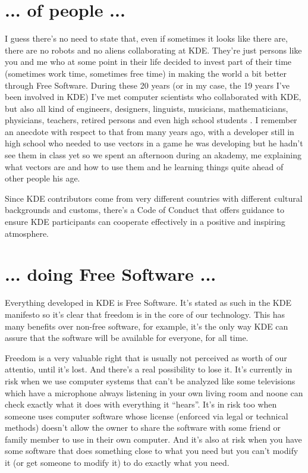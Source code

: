\section*{... of people ...}
I guess there’s no need to state that, even if sometimes it looks like there are, there are no robots and no aliens collaborating at KDE. They’re just persons like you and me who at some point in their life decided to invest part of their time (sometimes work time, sometimes free time) in making the world a bit better through Free Software. During these 20 years (or in my case, the 19 years I’ve been involved in KDE) I’ve met computer scientists who collaborated with KDE, but also all kind of engineers, designers, linguists, musicians, mathematicians, physicians, teachers, retired persons and even high school students . I remember an anecdote with respect to that from many years ago, with a developer still in high school who needed to use vectors in a game he was developing but he hadn’t see them in class yet so we spent an afternoon during an akademy, me explaining what vectors are and how to use them and he learning things quite ahead of other people his age.

Since KDE contributors come from very different countries with different cultural backgrounds and customs, there’s a Code of Conduct that offers guidance to ensure KDE participants can cooperate effectively in a positive and inspiring atmosphere.

\section*{... doing Free Software ...}
Everything developed in KDE is Free Software. It’s stated as such in the KDE manifesto so it’s clear that freedom is in the core of our technology. This has many benefits over non-free software, for example, it’s the only way KDE can assure that the software will be available for everyone, for all time. 

Freedom is a very valuable right that is usually not perceived as worth of our attentio, until it’s lost. And there’s a real possibility to lose it. It’s currently in risk when we use computer systems that can’t be analyzed like some televisions which have a microphone always listening in your own living room and noone can check exactly what it does with everything it “hears”. It’s in risk too when someone uses computer software whose license (enforced via legal or technical methods) doesn’t allow the owner to share the software with some friend or family member to use in their own computer. And it’s also at risk when you have some software that does something close to what you need but you can’t modify it (or get someone to modify it) to do exactly what you need.

